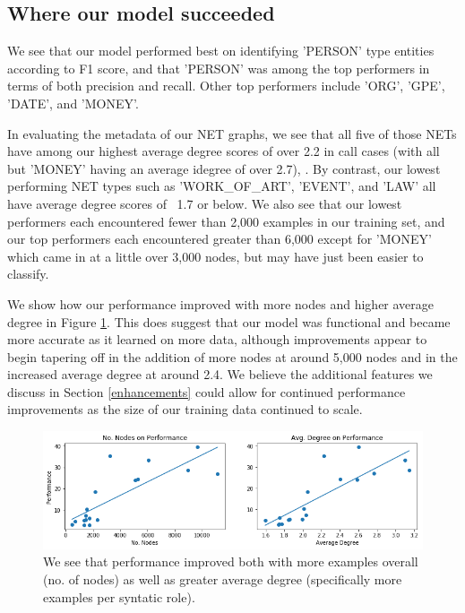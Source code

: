 \documentclass[11pt,a4paper]{article}
\begin{document}
\subsection{Where our model succeeded}

We see that our model performed best on identifying 'PERSON' type entities according to F1 score, and that 'PERSON' was among the top performers in terms of both precision and recall. Other top performers include 'ORG', 'GPE', 'DATE', and 'MONEY'.

In evaluating the metadata of our NET graphs, we see that all five of those NETs have among our highest average degree scores of over 2.2 in call cases (with all but 'MONEY' having an average idegree of over 2.7), . By contrast, our lowest performing NET types such as 'WORK\_OF\_ART', 'EVENT', and 'LAW' all have average degree scores of ~1.7 or below. We also see that our lowest performers each encountered fewer than 2,000 examples in our training set, and our top performers each encountered greater than 6,000 except for 'MONEY' which came in at a little over 3,000 nodes, but may have just been easier to classify.

We show how our performance improved with more nodes and higher average degree in Figure \ref{fig:performance}. This does suggest that our model was functional and became more accurate as it learned on more data, although improvements appear to begin tapering off in the addition of more nodes at around 5,000 nodes and in the increased average degree at around 2.4. We believe the additional features we discuss in Section \ref{enhancements} could allow for continued performance improvements as the size of our training data continued to scale.

\begin{figure}[ht]
  \includegraphics[width=\textwidth]{figures/performance.png}
  \caption{We see that performance improved both with more examples overall (no. of nodes) as well as greater average degree (specifically more examples per syntatic role).}
  \label{fig:performance}
\end{figure}
\end{document}
